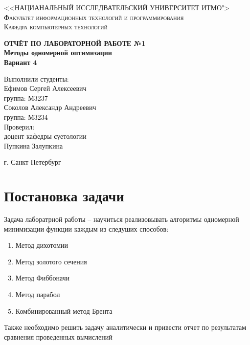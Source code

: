 \documentclass[a4paper, 42pt]{article}
\begin{document}
	\renewcommand{\chaptername}{Лабораторная работа}
	\def\contentsname{Содержание}

	\begin{titlepage}
		\begin{center}
			\textsc{<<НАЦИАНАЛЬНЫЙ ИССЛЕДВАТЕЛЬСКИЙ УНИВЕРСИТЕТ ИТМО">\\[5mm]
				Факультет информационных технологий и программирования\\[2mm]
				Кафедра компьютерных технологий}

			\vfill

			\textbf{ОТЧЁТ ПО ЛАБОРАТОРНОЙ РАБОТЕ №1\\[3mm]
				Методы одномерной оптимизации\\[6mm]
				Вариант 4
				\\[20mm]
			}
		\end{center}

		\hfill
		\begin{minipage}{.5\textwidth}
			Выполнили студенты:\\[2mm]
			Ефимов Сергей Алексеевич\\
			группа: М3237\\[2mm]
			Соколов Александр Андреевич\\
			группа: М3234\\[5mm]

			Проверил:\\[2mm]
			доцент кафедры суетологии\\
			Пупкина Залупкина
		\end{minipage}%
		\vfill
		\begin{center}
			г. Санкт-Петербург
		\end{center}
	\end{titlepage}


	\section*{Постановка задачи}
	Задача лаборатрной работы  -- научиться реализовывать алгоритмы одномерной минимизации функции каждым из следуших способов:
	\begin{enumerate}
		\item Метод дихотомии
		\item Метод золотого сечения
		\item Метод Фиббоначи
		\item Метод парабол
		\item Комбинированный метод Брента
	\end{enumerate}
	Также необходимо решить задачу аналитически и привести отчет по результатам сравнения проведенных вычислений
\end{document}

